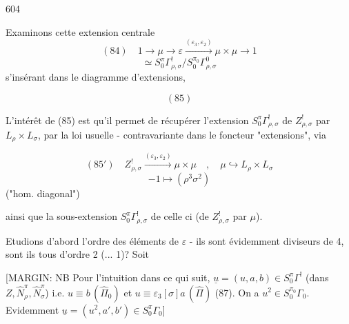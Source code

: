 \begin{enumerate}

\newpage



\newpage


604

Examinons cette extension centrale
$$ (84) \quad 1 \to \mu \to \varepsilon \xrightarrow{(\varepsilon_3, \varepsilon_2)} \mu \times \mu \to 1 $$
$$ \simeq S_0^\pi \Gamma_{\rho,\sigma}^! / S_0^{\pi_0} \Gamma_{\rho,\sigma}^0 $$
s'insérant dans le diagramme d'extensions,

$$ (85) $$

L'intérêt de (85) est qu'il permet de récupérer l'extension $S_0^\pi \Gamma_{\rho,\sigma}^!$ de $Z_{\rho,\sigma}^!$ par $L_\rho \times L_\sigma$, par la loi usuelle - contravariante dans le foncteur "extensions", via

$$ (85') \quad Z_{\rho,\sigma}^! \xrightarrow{(\varepsilon_3, \varepsilon_2)} \mu \times \mu \quad , \quad \mu \hookrightarrow L_\rho \times L_\sigma $$
$$ -1 \mapsto (\rho^3 \sigma^2) $$
("hom. diagonal")

ainsi que la sous-extension $S_0^\pi \Gamma_{\rho,\sigma}^!$ de celle ci (de $Z_{\rho,\sigma}^!$ par $\mu$).

Etudions d'abord l'ordre des éléments de $\varepsilon$ - ils sont évidemment diviseurs de 4, sont ils tous d'ordre 2 (... 1)? Soit

[MARGIN: NB Pour l'intuition dans ce qui suit, $\underline{u} = (u,a,b) \in S_0^\pi \Gamma^!$ (dans $Z, \hat{N}_\rho^\pi, \hat{N}_\sigma^\pi$) i.e. $u \equiv b \, (\hat{\Pi}_0)$ et $u \equiv \varepsilon_3[\sigma] a \, (\hat{\Pi})$ (87). On a $u^2 \in S_0^{\pi_0} \Gamma_0$. Evidemment $\underline{u} = (u^2, a', b') \in S_0^\pi \Gamma_0$]


\end{enumerate}
